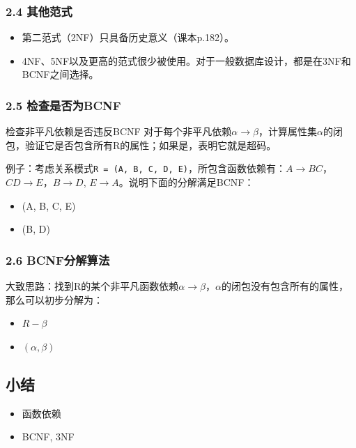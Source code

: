 \documentclass[aspectratio=169, 14pt]{beamer}
\begin{document}
\begin{frame}
    \frametitle{2.4 其他范式}
\begin{itemize}
    \item 第二范式（2NF）只具备历史意义（课本p.182）。
    \item 4NF、5NF以及更高的范式很少被使用。对于一般数据库设计，\alert{都是在3NF和BCNF之间选择。}
\end{itemize}
    

\end{frame}

\begin{frame}
    \frametitle{2.5 检查是否为BCNF}
\begin{exampleblock}{检查非平凡依赖是否违反BCNF}
    对于每个非平凡依赖$\alpha \rightarrow \beta$，计算属性集$\alpha$的闭包，验证它是否包含所有R的属性；如果是，表明它就是超码。    
\end{exampleblock}
  
\pause 
例子：考虑关系模式\texttt{R = (A, B, C, D, E)}，所包含函数依赖有：$A \rightarrow BC$，$CD \rightarrow E$，$B \rightarrow D$, $E \rightarrow A$。说明下面的分解满足BCNF：

\begin{itemize}
    \item (A, B, C, E)
    \item (B, D)
\end{itemize}

\end{frame}

\begin{frame}
    \frametitle{2.6 BCNF分解算法}
大致思路：找到R的某个非平凡函数依赖$\alpha \rightarrow \beta$，$\alpha$的闭包没有包含所有的属性，那么可以初步分解为：

\begin{itemize}
    \item $R - \beta$
    \item $(\alpha, \beta)$
\end{itemize}

\end{frame}

\begin{frame}
\end{frame}

\begin{frame}
    \section{\textcolor{darkmidnightblue}{小结}}
    \begin{itemize}
        \item 函数依赖
        \item BCNF, 3NF
    \end{itemize}
\end{frame}
\end{document}
